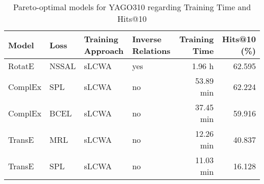\begin{table}[H]
\centering
\caption{Pareto-optimal models for YAGO310 regarding Training Time and Hits@10}
\label{tab:skyline_yago310_training_time}
\begin{tabular}{llllrr}
\toprule
   Model &   Loss & Training Approach & Inverse Relations & Training Time &  Hits@10 (\%) \\
\midrule
  RotatE &  NSSAL &             sLCWA &               yes &        1.96 h &       62.595 \\
 ComplEx &    SPL &             sLCWA &                no &     53.89 min &       62.224 \\
 ComplEx &   BCEL &             sLCWA &                no &     37.45 min &       59.916 \\
  TransE &    MRL &             sLCWA &                no &     12.26 min &       40.837 \\
  TransE &    SPL &             sLCWA &                no &     11.03 min &       16.128 \\
\bottomrule
\end{tabular}
\end{table}


